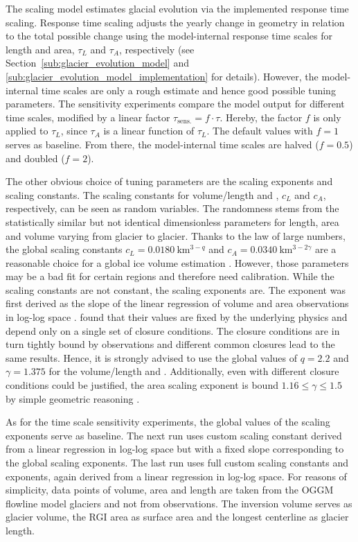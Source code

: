         The scaling model estimates glacial evolution via the implemented response time scaling. Response time scaling adjusts the yearly change in geometry in relation to the total possible change using the model-internal response time scales for length and area, $\tau_L$ and  $\tau_A$, respectively (see Section~\ref{sub:glacier_evolution_model} and \ref{sub:glacier_evolution_model_implementation} for details).
        However, the model-internal time scales are only a rough estimate and hence good possible tuning parameters. The sensitivity experiments compare the model output for different time scales, modified by a linear factor $\tau_\text{sens.} = f \cdot \tau$. Hereby, the factor $f$ is only applied to $\tau_L$, since $\tau_A$ is a linear function of $\tau_L$. The default values with $f=1$ serves as baseline. From there, the model-internal time scales are halved ($f=0.5$) and doubled ($f=2$). 

        The other obvious choice of tuning parameters are the scaling exponents and scaling constants. The scaling constants for volume/length and \vas{}, $c_L$ and $c_A$, respectively, can be seen as random variables. The randomness stems from the statistically similar but not identical dimensionless parameters for length, area and volume  varying from glacier to glacier. Thanks to the law of large numbers, the global scaling constants $c_L = \SI{0.0180}{\kilo\meter^{3-q}}$ and $c_A = \SI{0.0340}{\kilo\meter^{3-2\gamma}}$ are a reasonable choice for a global ice volume estimation \citep{Bahr2015}. However, those parameters may be a bad fit for certain regions and therefore need calibration.
        While the scaling constants are not constant, the scaling exponents are. The \vas{} exponent was first derived as the slope of the linear regression of volume and area observations in log-log space \citep[e.g.,][]{Chen1990}. \citet{Bahr1997b} found that their values are fixed by the underlying physics and depend only on a single set of closure conditions. The closure conditions are in turn tightly bound by observations and different common closures lead to the same results. Hence, it is strongly advised to use the global values of $q = 2.2$ and $\gamma = 1.375$  for the volume/length and \vas{}. Additionally, even with different closure conditions could be justified, the area scaling exponent is bound $1.1\dot{6} \leq \gamma \leq 1.5$ by simple geometric reasoning \citep[Section 8.2]{Bahr2015}. 

        As for the time scale sensitivity experiments, the global values of the scaling exponents serve as baseline. The next run uses custom scaling constant derived from a linear regression in log-log space but with a fixed slope corresponding to the global scaling exponents. The last run uses full custom scaling constants and exponents, again derived from a linear regression in log-log space. For reasons of simplicity, data points of volume, area and length are taken from the OGGM flowline model glaciers and not from observations. The inversion volume serves as glacier volume, the RGI area as surface area and the longest centerline as glacier length.
        
